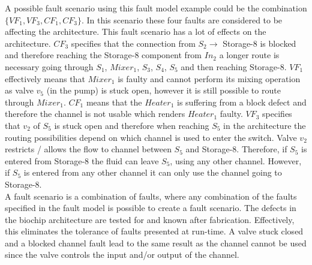 A possible fault scenario using this fault model example could be the combination $\{VF_1, VF_3, CF_1, CF_3\}$. In this scenario these four faults are considered to be affecting the architecture. This fault scenario has a lot of effects on the architecture. $CF_3$ specifies that the connection from $S_2 \rightarrow$ Storage-8 is blocked and therefore reaching the Storage-8 component from $In_2$ a longer route is necessary going through $S_1$, $Mixer_1$, $S_3$, $S_4$, $S_5$ and then reaching Storage-8. $VF_1$ effectively means that $Mixer_1$ is faulty and cannot perform its mixing operation as valve $v_5$ (in the pump) is stuck open, however it is still possible to route through $Mixer_1$. $CF_1$ means that the $Heater_1$ is suffering from a block defect and therefore the channel is not usable which renders $Heater_1$ faulty. $VF_3$ specifies that $v_2$ of $S_5$ is stuck open and therefore when reaching $S_5$ in the architecture the routing possibilities depend on which channel is used to enter the switch. Valve $v_2$ restricts / allows the flow to channel between $S_5$ and Storage-8. Therefore, if $S_5$ is entered from Storage-8 the fluid can leave $S_5$, using any other channel. However, if $S_5$ is entered from any other channel it can only use the channel going to Storage-8.\\

A fault scenario is a combination of faults, where any combination of the faults specified in the fault model is possible to create a fault scenario. The defects in the biochip architecture are tested for and known after fabrication. Effectively, this eliminates the tolerance of faults presented at run-time. A valve stuck closed and a blocked channel fault lead to the same result as the channel cannot be used since the valve controls the input and/or output of the channel.

